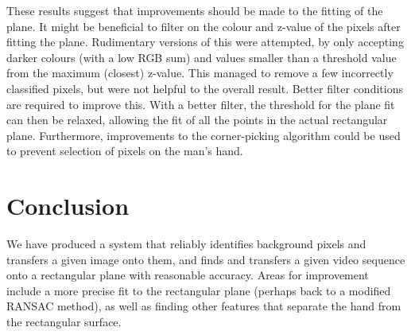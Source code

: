 \documentclass[11pt]{article}
\begin{document}
These results suggest that improvements should be made to the fitting of the plane. It might be beneficial to filter on the colour and z-value of the pixels after fitting the plane. Rudimentary versions of this were attempted, by only accepting darker colours (with a low RGB sum) and values smaller than a threshold value from the maximum (closest) z-value. This managed to remove a few incorrectly classified pixels, but were not helpful to the overall result. Better filter conditions are required to improve this. With a better filter, the threshold for the plane fit can then be relaxed, allowing the fit of all the points in the actual rectangular plane. Furthermore, improvements to the corner-picking algorithm could be used to prevent selection of pixels on the man's hand.

\section{Conclusion}
We have produced a system that reliably identifies background pixels and transfers a given image onto them, and finds and transfers a given video sequence onto a rectangular plane with reasonable accuracy. Areas for improvement include a more precise fit to the rectangular plane (perhaps back to a modified RANSAC method), as well as finding other features that separate the hand from the rectangular surface.
\end{document}
